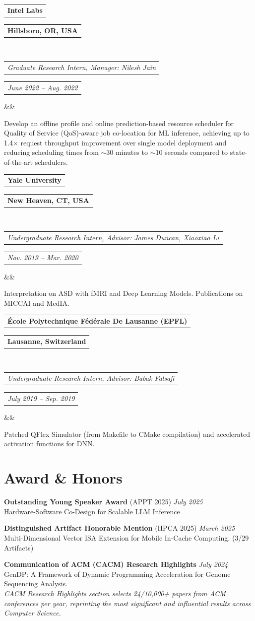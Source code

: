 \documentclass[10pt,a4paper,palatine]{moderncv}        %
\makeatletter
\newcommand*{\customcventry}[7][.25em]{
  \begin{tabular}{@{}l} 
    {\bfseries #4}
  \end{tabular}
  \hfill%
  \begin{tabular}{l@{}}
     {\bfseries #5}
  \end{tabular} \\
  \begin{tabular}{@{}l} 
    {\itshape #3}
  \end{tabular}
  \hfill%
  \begin{tabular}{l@{}}
     {\itshape #2}
  \end{tabular}
  \ifx&#7&%
  \else{\\%
    \begin{minipage}{\maincolumnwidth}%
      \small#7%
    \end{minipage}}\fi%
  \par\addvspace{#1}}
\makeatother
\begin{document}
{\customcventry{June 2022 – Aug. 2022}{Graduate Research Intern, Manager: Nilesh Jain}{Intel Labs}{Hillsboro, OR, USA}{}{}}
\vspace*{-4mm}
Develop an offline profile and online prediction-based resource scheduler for Quality of Service (QoS)-aware job co-location for ML inference, achieving up to 1.4$\times$ request throughput improvement over single model deployment and reducing scheduling times from $\sim$30 minutes to $\sim$10 seconds compared to state-of-the-art schedulers.
\vspace*{-1mm}


{\customcventry{Nov. 2019 – Mar. 2020}{Undergraduate Research Intern, Advisor: James Duncan, Xiaoxiao Li}{Yale University}{New Heaven, CT, USA}{}{}}
\vspace*{-4mm}
Interpretation on ASD with fMRI and Deep Learning Models. Publications on MICCAI and MedIA.
\vspace*{-1mm}


{\customcventry{July 2019 – Sep. 2019}{Undergraduate Research Intern, Advisor: Babak Falsafi}{École Polytechnique Fédérale De Lausanne (EPFL)}{Lausanne, Switzerland}{}{}}
\vspace{-4mm}
Patched QFlex Simulator (from Makefile to CMake compilation) and accelerated activation functions for DNN.
\vspace*{-1mm}


\section{Award \& Honors}
\vspace{-2mm}

\textbf{Outstanding Young Speaker Award} (APPT 2025) \hfill {\itshape July 2025} \\
Hardware-Software Co-Design for Scalable LLM Inference
\vspace{-2mm}

\textbf{Distinguished Artifact Honorable Mention} (HPCA 2025) \hfill {\itshape March 2025} \\
Multi-Dimensional Vector ISA Extension for Mobile In-Cache Computing. (3/29 Artifacts)
\vspace{-2mm}

\begin{samepage}
\textbf{Communication of ACM (CACM) Research Highlights}  \hfill {\itshape July 2024} \\
GenDP: A Framework of Dynamic Programming Acceleration for Genome Sequencing Analysis. \\
\textit{CACM Research Highlights section selects 24/10,000+ papers from ACM conferences per year, reprinting the most significant and influential results across Computer Science.}
\par
\end{samepage}
\vspace{-2mm}
\end{document}
